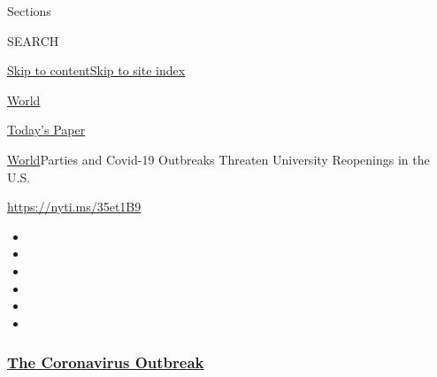 Sections

SEARCH

\protect\hyperlink{site-content}{Skip to
content}\protect\hyperlink{site-index}{Skip to site index}

\href{https://www.nytimes3xbfgragh.onion/section/world}{World}

\href{https://myaccount.nytimes3xbfgragh.onion/auth/login?response_type=cookie\&client_id=vi}{}

\href{https://www.nytimes3xbfgragh.onion/section/todayspaper}{Today's
Paper}

\href{/section/world}{World}\textbar{}Parties and Covid-19 Outbreaks
Threaten University Reopenings in the U.S.

\url{https://nyti.ms/35et1B9}

\begin{itemize}
\item
\item
\item
\item
\item
\item
\end{itemize}

\hypertarget{the-coronavirus-outbreak}{%
\subsubsection{\texorpdfstring{\href{https://www.nytimes3xbfgragh.onion/news-event/coronavirus?name=styln-coronavirus-national\&region=TOP_BANNER\&block=storyline_menu_recirc\&action=click\&pgtype=Article\&impression_id=b3060d60-f1be-11ea-80a4-6f259d33a91b\&variant=undefined}{The
Coronavirus
Outbreak}}{The Coronavirus Outbreak}}\label{the-coronavirus-outbreak}}

